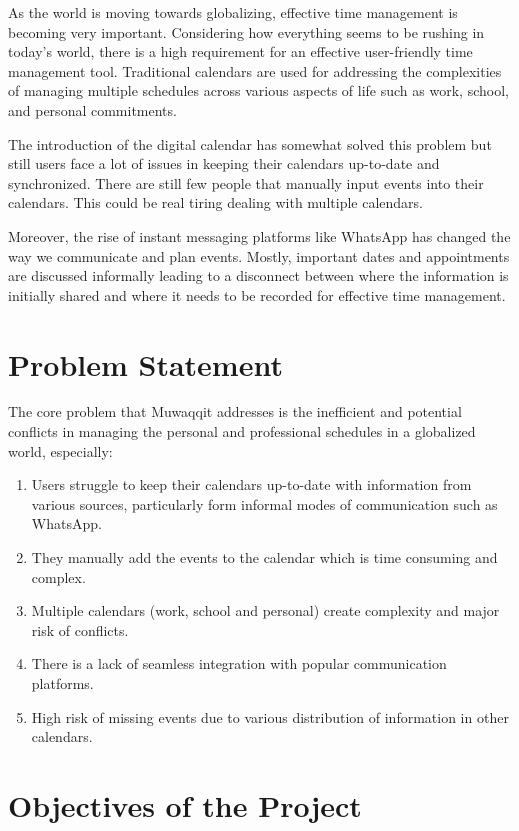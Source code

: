 \documentclass[12pt,a4paper]{article}
\begin{document}
As the world is moving towards globalizing, effective time management is becoming very important. Considering how everything seems to be rushing in today's world, there is a high requirement for an effective user-friendly time management tool. Traditional calendars are used for addressing the complexities of managing multiple schedules across various aspects of life such as work, school, and personal commitments.

The introduction of the digital calendar has somewhat solved this problem but still users face a lot of issues in keeping their calendars up-to-date and synchronized. There are still few people that manually input events into their calendars. This could be real tiring dealing with multiple calendars.

Moreover, the rise of instant messaging platforms like WhatsApp has changed the way we communicate and plan events. Mostly, important dates and appointments are discussed informally leading to a disconnect between where the information is initially shared and where it needs to be recorded for effective time management. 

\section{Problem Statement}

The core problem that Muwaqqit addresses is the inefficient and potential conflicts in managing the personal and professional schedules in a globalized world, especially:

\begin{enumerate}
    \item Users struggle to keep their calendars up-to-date with information from various sources, particularly form informal modes of communication such as WhatsApp.
    \item They manually add the events to the calendar which is time consuming and complex.
    \item Multiple calendars (work, school and personal) create complexity and major risk of conflicts.
    \item There is a lack of seamless integration with popular communication platforms.
    \item High risk of missing events due to various distribution of information in other calendars.
\end{enumerate}

\section{Objectives of the Project}
\end{document}
